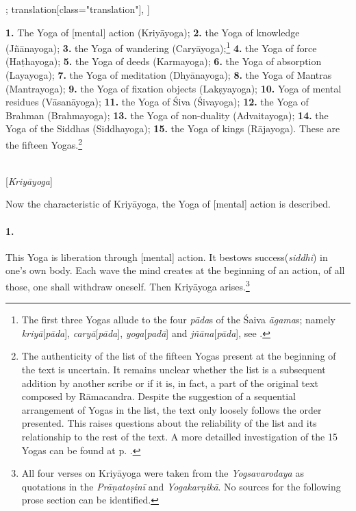 \begin{alignment}[
    texts=edition[class="edition"];
    translation[class="translation"],
  ]
\begin{translation}
\begin{tlate}
\indent \textbf{1.} The Yoga of [mental] action (Kriyāyoga); \textbf{2.} the Yoga of knowledge (Jñānayoga); \textbf{3.} the Yoga of wandering (Caryāyoga);\footnote{The first three Yogas allude to the four \textit{pāda}s of the Śaiva \textit{āgama}s; namely \textit{kriyā}[\textit{pāda}], \textit{caryā}[\textit{pāda}], \textit{yoga}[\textit{padā}] and \textit{jñāna}[\textit{pāda}], see \citeauthor[2015: 77]{nishvasa2015}.} \textbf{4.} the Yoga of force (Haṭhayoga); \textbf{5.} the Yoga of deeds (Karmayoga); \textbf{6.} the Yoga of absorption (Layayoga); \textbf{7.} the Yoga of meditation (Dhyānayoga); \textbf{8.} the Yoga of Mantras (Mantrayoga); \textbf{9.} the Yoga of fixation objects (Lakṣyayoga); \textbf{10.} Yoga of mental residues (Vāsanāyoga); \textbf{11.} the Yoga of Śiva (Śivayoga); \textbf{12.} the Yoga of Brahman (Brahmayoga); \textbf{13.} the Yoga of non-duality (Advaitayoga); \textbf{14.} the Yoga of the Siddhas (Siddhayoga); \textbf{15.} the Yoga of kings (Rājayoga). These are the fifteen Yogas.\footnote{The authenticity of the list of the fifteen Yogas present at the beginning of the text is uncertain. It remains unclear whether the list is a subsequent addition by another scribe or if it is, in fact, a part of the original text composed by Rāmacandra. Despite the suggestion of a sequential arrangement of Yogas in the list, the text only loosely follows the order presented. This raises questions about the reliability of the list and its relationship to the rest of the text. A more detailled investigation of the 15 Yogas can be found at p. \pageref{yogas_list}.}\\\\
      \bigskip 
      \centerline{\textrm{\small{[\textit{Kriyāyoga}]}}}
      \bigskip
      \indent Now the characteristic of Kriyāyoga, the Yoga of [mental] action is described. \paragraph{1.} This Yoga is liberation through [mental] action. It bestows success(\textit{siddhi}) in one's own body. Each wave the mind creates at the beginning of an action, of all those, one shall withdraw oneself. Then Kriyāyoga arises.\footnote{All four verses on Kriyāyoga were taken from the \textit{Yogsavarodaya} as quotations in the \textit{Prāṇatoṣinī} and \textit{Yogakarṇikā}. No sources for the following prose section can be identified.}\vspace*{\fill}
      \vfill
\end{tlate}
 \ekdpb*{}
   \end{translation}
 \end{alignment}
